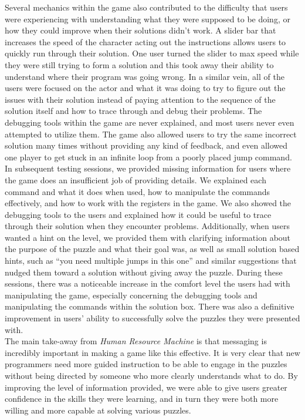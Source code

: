 Several mechanics within the game also contributed to the difficulty that users were experiencing with understanding what they were supposed to be doing, or how they could improve when their solutions didn’t work. A slider bar that increases the speed of the character acting out the instructions allows users to quickly run through their solution. One user turned the slider to max speed while they were still trying to form a solution and this took away their ability to understand where their program was going wrong. In a similar vein, all of the users were focused on the actor and what it was doing to try to figure out the issues with their solution instead of paying attention to the sequence of the solution itself and how to trace through and debug their problems. The debugging tools within the game are never explained, and most users never even attempted to utilize them. The game also allowed users to try the same incorrect solution many times without providing any kind of feedback, and even allowed one player to get stuck in an infinite loop from a poorly placed jump command.\\

In subsequent testing sessions, we provided missing information for users where the game does an insufficient job of providing details. We explained each command and what it does when used, how to manipulate the commands effectively, and how to work with the registers in the game. We also showed the debugging tools to the users and explained how it could be useful to trace through their solution when they encounter problems. Additionally, when users wanted a hint on the level, we provided them with clarifying information about the purpose of the puzzle and what their goal was, as well as small solution based hints, such as “you need multiple jumps in this one” and similar suggestions that nudged them toward a solution without giving away the puzzle. During these sessions, there was a noticeable increase in the comfort level the users had with manipulating the game, especially concerning the debugging tools and manipulating the commands within the solution box. There was also a definitive improvement in users’ ability to successfully solve the puzzles they were presented with.\\

The main take-away from \textit{Human Resource Machine} is that messaging is incredibly important in making a game like this effective. It is very clear that new programmers need more guided instruction to be able to engage in the puzzles without being directed by someone who more clearly understands what to do. By improving the level of information provided, we were able to give users greater confidence in the skills they were learning, and in turn they were both more willing and more capable at solving various puzzles.\\

